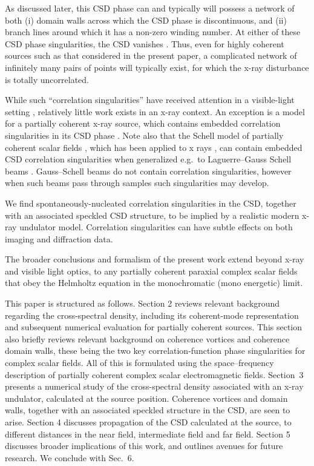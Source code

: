 \documentclass[%
 reprint,
 amsmath,amssymb,
 aps,
]{revtex4-1}
\begin{document}
As discussed later, this CSD phase can and typically will possess a network of both (i) domain walls across which the CSD phase is discontinuous, and (ii) branch lines around which it has a non-zero winding number.  At either of these CSD phase singularities, the CSD vanishes \cite{TopologicalReactionsCohVortices,Marasinghe2010}.  Thus, even for highly coherent sources such as that considered in the present paper, a complicated network of infinitely many pairs of points will typically exist, for which the x-ray disturbance is totally uncorrelated. 

While such ``correlation singularities'' have received attention in a visible-light setting \cite{Schouten2003,GburVisser2003,Bogatyryova2003,FischerVisser2004,Palacios2004,GburVisser2006,Wang2006,TopologicalReactionsCohVortices,GburVisser2010,Marasinghe2010,Marasinghe2011}, relatively little work exists in an x-ray context.  An exception is a model for a partially coherent x-ray source, which contains embedded correlation singularities in its CSD phase  \cite{PellicciaPaganin2012}. Note also that the Schell model of partially coherent scalar fields \cite{mandel_wolf}, which has been applied to x rays \cite{Coisson1997,Vartanyants2010}, can contain embedded CSD correlation singularities when generalized e.g.~to Laguerre--Gauss Schell beams \cite{Palacios2004,Rodrigo2015}.  Gauss--Schell beams do not contain correlation singularities, however when such beams pass through samples such singularities may develop. 

We find spontaneously-nucleated correlation singularities in the CSD, together with an associated speckled CSD structure, to be implied by a realistic modern x-ray undulator model. Correlation singularities can have subtle effects on both imaging and diffraction data.  

The broader conclusions and formalism of the present work extend beyond x-ray and visible light optics, to any partially coherent paraxial complex scalar fields that obey the Helmholtz equation in the monochromatic (mono energetic) limit.

This paper is structured as follows. Section 2 reviews relevant background regarding the cross-spectral density, including its coherent-mode representation and subsequent numerical evaluation for partially coherent sources.  This section also briefly reviews relevant background on coherence vortices and coherence domain walls, these being the two key correlation-function phase singularities for complex scalar fields.  All of this is formulated using the space--frequency description of partially coherent complex scalar electromagnetic fields.  Section~3 presents a numerical study of the cross-spectral density associated with an x-ray undulator, calculated at the source position.  Coherence vortices and domain walls, together with an associated speckled structure in the CSD, are seen to arise. Section 4 discusses propagation of the CSD calculated at the source, to different distances in the near field, intermediate field and far field. Section 5 discusses broader implications of this work, and outlines avenues for future research.  We conclude with Sec.~6.
\end{document}
